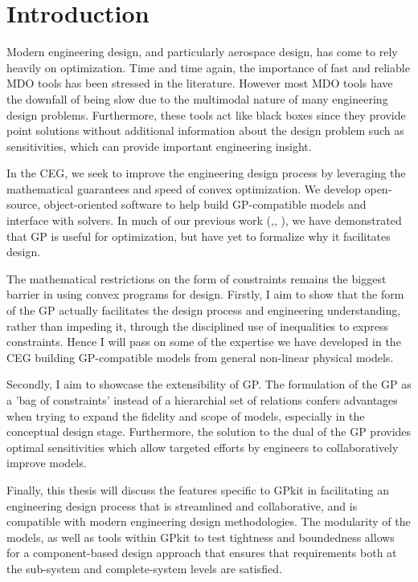 \chapter{Introduction}
\label{ch1_intro}

Modern engineering design, and particularly aerospace design, has come to rely
heavily on optimization. Time and time again, the importance of fast and
reliable \gls{MDO} tools has been stressed in the literature. However most \gls{MDO} tools
have the downfall of being slow due to the multimodal nature of many
engineering design problems. Furthermore, these tools act like black boxes since
they provide point solutions without additional information about the design problem
such as sensitivities, which can provide important engineering insight.
	
In the \gls{CEG}, we seek to improve the engineering design process by
leveraging the mathematical guarantees and speed of convex optimization. We develop
open-source, object-oriented software to help build \gls{GP}-compatible models and
interface with solvers. In much of our previous work
(\cite{gp_ac_design},\cite{SP_ac_design}, \cite{sp_engine}), we have demonstrated that
\gls{GP} is useful for optimization, but have yet to formalize why it
facilitates design.
 
The mathematical restrictions on the form of constraints remains the biggest
barrier in using convex programs for design. Firstly, I
aim to show that the form of the GP actually facilitates the design process
and engineering understanding, rather than impeding it, through the disciplined use
of inequalities to express constraints. Hence I will
pass on some of the expertise we have developed in the \gls{CEG} building
\gls{GP}-compatible models from general non-linear physical models. 

Secondly, I aim to showcase the extensibility of \gls{GP}.
The formulation of the \gls{GP} as a 'bag of
constraints' instead of a hierarchial set of relations confers advantages 
when trying to expand the fidelity and scope of models, especially in the 
conceptual design stage. Furthermore, the solution to the dual of the \gls{GP}
provides optimal sensitivities which allow targeted efforts by engineers to
collaboratively improve models.

Finally, this thesis will discuss the features specific to GPkit in facilitating
an engineering design process that is streamlined and collaborative, and is
compatible with modern engineering design methodologies. The modularity of the 
models, as well as tools within GPkit to test tightness and boundedness
allows for a component-based design approach that ensures that
requirements both at the sub-system and complete-system levels are satisfied.

